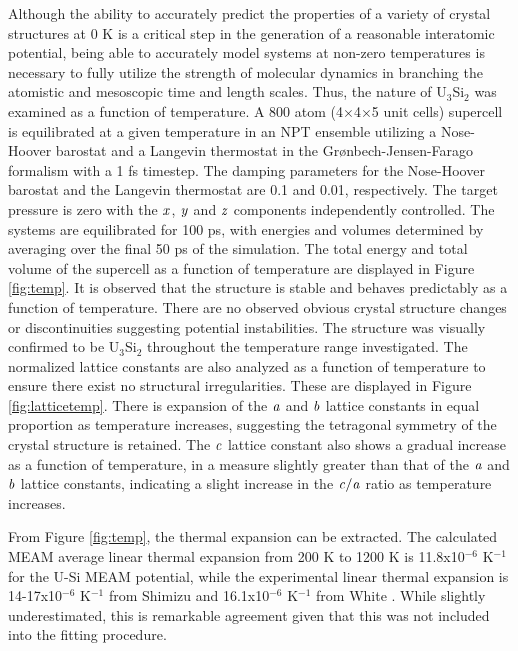 \documentclass[review]{elsarticle}
\begin{document}
Although the ability to accurately predict the properties of a variety of crystal structures at 0 K is a critical step in the generation of a reasonable interatomic potential, being able to accurately model systems at non-zero temperatures is necessary to fully utilize the strength of molecular dynamics in branching the atomistic and mesoscopic time and length scales.  Thus, the nature of U$_{3}$Si$_{2}$ was examined as a function of temperature.  A 800 atom (4$\times$4$\times$5 unit cells) supercell is equilibrated at a given temperature in an NPT ensemble utilizing a Nose-Hoover barostat and a Langevin thermostat in the Gr{\o}nbech-Jensen-Farago \cite{gjf2013} formalism with a 1 fs timestep.  The damping parameters for the Nose-Hoover barostat and the Langevin thermostat are 0.1 and 0.01, respectively.  The target pressure is zero with the $\it{x}$, $\it{y}$ and $\it{z}$ components independently controlled. The systems are equilibrated for 100 ps, with energies and volumes determined by averaging over the final 50 ps of the simulation.  The total energy and total volume of the supercell as a function of temperature are displayed in Figure \ref{fig:temp}.  It is observed that the structure is stable and behaves predictably as a function of temperature.   There are no observed obvious crystal structure changes or discontinuities suggesting potential instabilities.  The structure was visually confirmed to be U$_{3}$Si$_{2}$ throughout the temperature range investigated.  The normalized lattice constants are also analyzed as a function of temperature to ensure there exist no structural irregularities.  These are displayed in Figure \ref{fig:latticetemp}.  There is expansion of the $\it{a}$ and $\it{b}$ lattice constants in equal proportion as temperature increases, suggesting the tetragonal symmetry of the crystal structure is retained.  The $\it{c}$ lattice constant also shows a gradual increase as a function of temperature, in a measure slightly greater than that of the $\it{a}$ and $\it{b}$ lattice constants, indicating a slight increase in the $\it{c/a}$ ratio as temperature increases.  

From Figure \ref{fig:temp}, the thermal expansion can be extracted.  The calculated MEAM average linear thermal expansion from 200 K to 1200 K is 11.8x10$^{-6}$ K$^{-1}$ for the U-Si MEAM potential, while the experimental linear thermal expansion is 14-17x10$^{-6}$ K$^{-1}$ from Shimizu \cite{shimizu1965} and 16.1x10$^{-6}$ K$^{-1}$ from White \cite{white2015}.  While slightly underestimated, this is remarkable agreement given that this was not included into the fitting procedure.  
\end{document}
